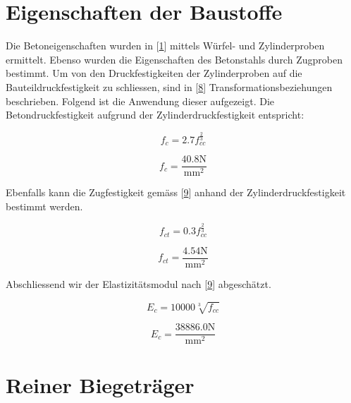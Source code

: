 \documentclass[
  12pt,
  letterpaper,
  egregdoesnotlikesansseriftitles]{scrreprt}
\begin{document}
\hypertarget{eigenschaften-der-baustoffe}{%
\section{Eigenschaften der
Baustoffe}\label{eigenschaften-der-baustoffe}}

Die Betoneigenschaften wurden in
{[}\protect\hyperlink{ref-Jaeger2006}{1}{]} mittels Würfel- und
Zylinderproben ermittelt. Ebenso wurden die Eigenschaften des
Betonstahls durch Zugproben bestimmt. Um von den Druckfestigkeiten der
Zylinderproben auf die Bauteildruckfestigkeit zu schliessen, sind in
{[}\protect\hyperlink{ref-Jaeger2014}{8}{]} Transformationsbeziehungen
beschrieben. Folgend ist die Anwendung dieser aufgezeigt. Die
Betondruckfestigkeit aufgrund der Zylinderdruckfestigkeit entspricht:

\begin{equation}f_{c} = 2.7 f_{cc}^{\frac{2}{3}}\end{equation}

\begin{equation}f_{c} = \frac{40.8 \text{N}}{\text{mm}^{2}}\end{equation}

Ebenfalls kann die Zugfestigkeit gemäss
{[}\protect\hyperlink{ref-Jaeger2013}{9}{]} anhand der
Zylinderdruckfestigkeit bestimmt werden.

\begin{equation}f_{ct} = 0.3 f_{cc}^{\frac{2}{3}}\end{equation}

\begin{equation}f_{ct} = \frac{4.54 \text{N}}{\text{mm}^{2}}\end{equation}

Abschliessend wir der Elastizitätsmodul nach
{[}\protect\hyperlink{ref-Jaeger2013}{9}{]} abgeschätzt.

\begin{equation}E_{c} = 10000 \sqrt[3]{f_{cc}}\end{equation}

\begin{equation}E_{c} = \frac{38886.0 \text{N}}{\text{mm}^{2}}\end{equation}

\hypertarget{reiner-biegetruxe4ger}{%
\section{Reiner Biegeträger}\label{reiner-biegetruxe4ger}}
\end{document}
